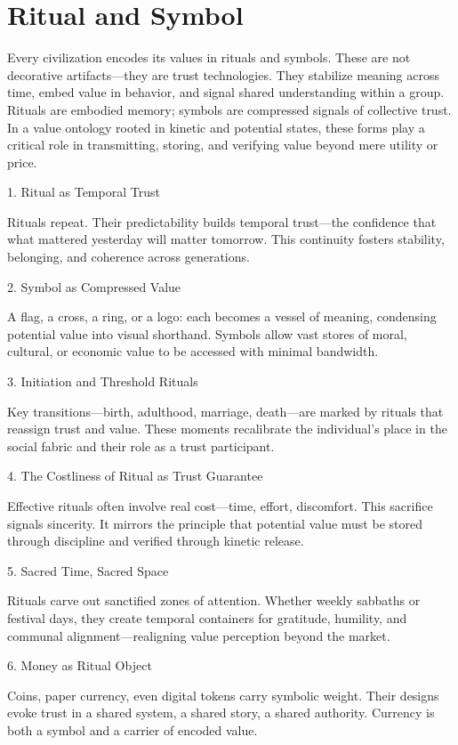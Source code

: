 \documentclass[11pt,oneside]{book}
\begin{document}
\chapter{ Ritual and Symbol}

Every civilization encodes its values in rituals and symbols. These are not decorative artifacts—they are trust technologies. They stabilize meaning across time, embed value in behavior, and signal shared understanding within a group. Rituals are embodied memory; symbols are compressed signals of collective trust. In a value ontology rooted in kinetic and potential states, these forms play a critical role in transmitting, storing, and verifying value beyond mere utility or price.


1. Ritual as Temporal Trust


Rituals repeat. Their predictability builds temporal trust—the confidence that what mattered yesterday will matter tomorrow. This continuity fosters stability, belonging, and coherence across generations.

2. Symbol as Compressed Value


A flag, a cross, a ring, or a logo: each becomes a vessel of meaning, condensing potential value into visual shorthand. Symbols allow vast stores of moral, cultural, or economic value to be accessed with minimal bandwidth.

3. Initiation and Threshold Rituals


Key transitions—birth, adulthood, marriage, death—are marked by rituals that reassign trust and value. These moments recalibrate the individual’s place in the social fabric and their role as a trust participant.

4. The Costliness of Ritual as Trust Guarantee


Effective rituals often involve real cost—time, effort, discomfort. This sacrifice signals sincerity. It mirrors the principle that potential value must be stored through discipline and verified through kinetic release.

5. Sacred Time, Sacred Space


Rituals carve out sanctified zones of attention. Whether weekly sabbaths or festival days, they create temporal containers for gratitude, humility, and communal alignment—realigning value perception beyond the market.

6. Money as Ritual Object


Coins, paper currency, even digital tokens carry symbolic weight. Their designs evoke trust in a shared system, a shared story, a shared authority. Currency is both a symbol and a carrier of encoded value.
\end{document}
